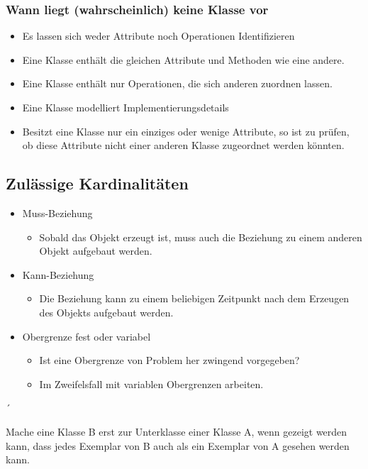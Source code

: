 \subsubsection{Wann liegt (wahrscheinlich) keine Klasse vor}
\begin{itemize}
    \item Es lassen sich weder Attribute noch Operationen Identifizieren
    \item Eine Klasse enthält die gleichen Attribute und Methoden wie eine andere.
    \item Eine Klasse enthält nur Operationen, die sich anderen zuordnen lassen.
    \item Eine Klasse modelliert Implementierungsdetails
    \item Besitzt eine Klasse nur ein einziges oder wenige Attribute, so ist zu prüfen, ob diese Attribute nicht einer anderen Klasse zugeordnet werden könnten.
\end{itemize}

\subsection{Zulässige Kardinalitäten}
\begin{itemize}
    \item Muss-Beziehung
    \begin{itemize}
        \item Sobald das Objekt erzeugt ist, muss auch die Beziehung zu einem anderen Objekt aufgebaut werden.
    \end{itemize}
    \item Kann-Beziehung
    \begin{itemize}
        \item Die Beziehung kann zu einem beliebigen Zeitpunkt nach dem Erzeugen des Objekts aufgebaut werden.
    \end{itemize}
    \item Obergrenze fest oder variabel
    \begin{itemize}
        \item Ist eine Obergrenze von Problem her zwingend vorgegeben?
        \item Im Zweifelsfall mit variablen Obergrenzen arbeiten.
    \end{itemize}
\end{itemize}´

Mache eine Klasse B erst zur Unterklasse einer Klasse A, wenn gezeigt werden kann, dass jedes Exemplar von B auch als ein Exemplar von A gesehen werden kann.